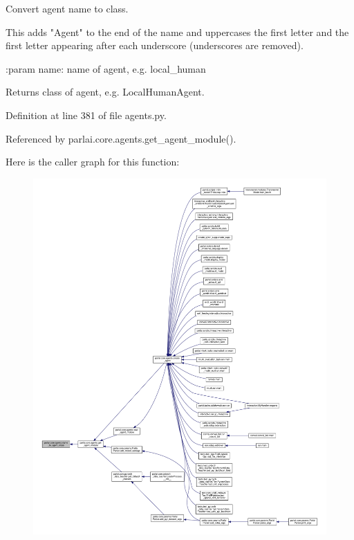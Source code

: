 \begin{DoxyVerb}Convert agent name to class.

This adds "Agent" to the end of the name and uppercases the first letter
and the first letter appearing after each underscore (underscores are
removed).

:param name: name of agent, e.g. local_human

Returns class of agent, e.g. LocalHumanAgent.
\end{DoxyVerb}
 

Definition at line 381 of file agents.\+py.



Referenced by parlai.\+core.\+agents.\+get\+\_\+agent\+\_\+module().

Here is the caller graph for this function\+:
\nopagebreak
\begin{figure}[H]
\begin{center}
\leavevmode
\includegraphics[width=350pt]{namespaceparlai_1_1core_1_1agents_a7a5f5076b35ce376d8b46bfb362bfc53_icgraph}
\end{center}
\end{figure}
